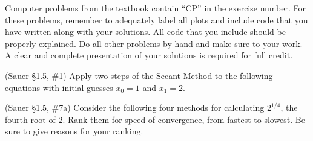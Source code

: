 \documentclass[12pt,fleqn]{exam}
\begin{document}
Computer problems from the textbook contain ``CP'' in the exercise number. For these problems, remember to adequately label all plots and include code that you have written along with your solutions. All code that you include should be properly explained. Do all other problems by hand and make sure to your work. A clear and complete presentation of your solutions is required for full credit.

\begin{questions}

\question (Sauer \S1.5, \#1) Apply two steps of the Secant Method to the following equations with initial guesses $x_0 = 1$ and $x_1 = 2$.


\question (Sauer \S1.5, \#7a) Consider the following four methods for calculating $2^{1/4}$, the fourth root of 2. Rank them for speed of convergence, from fastest to slowest. Be sure to give reasons for your ranking.



\end{questions}
\end{document}
